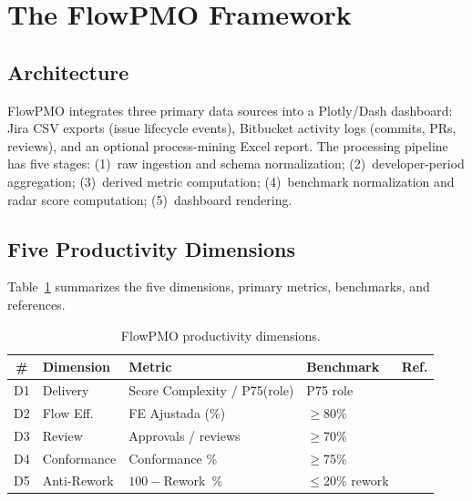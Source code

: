 \documentclass[conference]{IEEEtran}
\begin{document}
\section{The FlowPMO Framework}
\label{sec:framework}

\subsection{Architecture}

FlowPMO integrates three primary data sources into a Plotly/Dash dashboard:
Jira CSV exports (issue lifecycle events), Bitbucket activity logs (commits, PRs,
reviews), and an optional process-mining Excel report. The processing pipeline has
five stages: (1)~raw ingestion and schema normalization; (2)~developer-period
aggregation; (3)~derived metric computation; (4)~benchmark normalization and radar
score computation; (5)~dashboard rendering.

\subsection{Five Productivity Dimensions}

Table~\ref{tab:dimensions} summarizes the five dimensions, primary metrics,
benchmarks, and references.

\begin{table}[htbp]
  \centering
  \caption{FlowPMO productivity dimensions.}
  \label{tab:dimensions}
  \small
  \setlength{\tabcolsep}{4pt}
  \begin{tabular}{clp{2.2cm}p{1.5cm}c}
    \toprule
    \textbf{\#} & \textbf{Dimension} & \textbf{Metric} & \textbf{Benchmark} & \textbf{Ref.} \\
    \midrule
    D1 & Delivery  & Score Complexity / P75(role) & P75 role & \cite{jorgensen2014} \\
    D2 & Flow Eff. & FE Ajustada (\%) & $\geq$80\% & \cite{anderson2010} \\
    D3 & Review    & Approvals / reviews & $\geq$70\% & \cite{forsgren2021} \\
    D4 & Conformance & Conformance \% & $\geq$75\% & \cite{caldeira2019} \\
    D5 & Anti-Rework & $100-$Rework~\% & $\leq$20\% rework & \cite{shah2023} \\
    \bottomrule
  \end{tabular}
\end{table}
\end{document}

